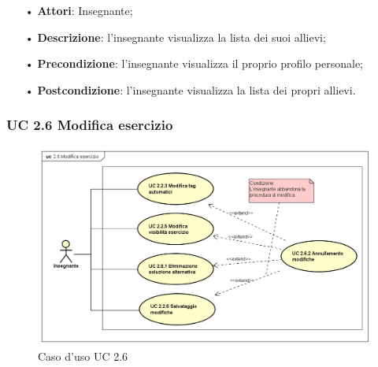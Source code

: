 \begin{itemize}
	\item[•] \textbf{Attori}: Insegnante;
	\item[•] \textbf{Descrizione}: l’insegnante visualizza la lista dei suoi allievi;
	\item[•] \textbf{Precondizione}: l'insegnante visualizza il proprio profilo personale;
	\item[•] \textbf{Postcondizione}: l’insegnante visualizza la lista dei propri allievi.
\end{itemize}



\subsubsection{UC 2.6 Modifica esercizio}
\begin{figure}[H]
\centering
\includegraphics[width=17cm]{img/UC26.png} 
\caption{Caso d'uso UC 2.6}
\end{figure}

